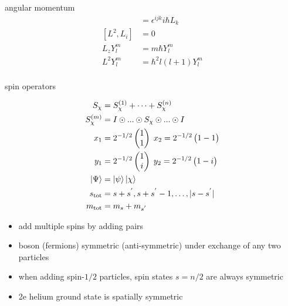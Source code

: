 \documentclass[avery5388, frame, grid]{flashcards}
\begin{document}
\begin{flashcard}{angular momentum}
  {
    \begin{align*}
      [L_{i}, L_{j}] &= \epsilon^{ijk} i \hbar L_{k}\\
      [L^{2}, L_{i}] &= 0\\
      L_{z} Y_{l}^{m} &= m \hbar Y_{l}^{m}\\
      L^{2} Y_{l}^{m} &= \hbar^{2} l(l + 1) Y_{l}^{m}\\
    \end{align*}
  }
\end{flashcard}

\begin{flashcard}{spin operators}
  {
    \begin{align*}
      S_{\chi} &= S_{\chi}^{(1)} + \dots + S_{\chi}^{(n)}\\
      S_{\chi}^{(m)} &= I \odot ... \odot S_{\chi} \odot ... \odot I\\
      x_{1} &= 2^{-1/2} \begin{pmatrix} 1\\ 1 \end{pmatrix} \; x_{2} = 2^{-1/2} \begin{pmatrix} 1 -1 \end{pmatrix}\\
      y_{1} &= 2^{-1/2} \begin{pmatrix} 1\\ i \end{pmatrix} \; y_{2} = 2^{-1/2} \begin{pmatrix} 1 -i \end{pmatrix}\\
      \ket{\Psi} &= \ket{\psi} \ket{\chi}\\
      s_{\textrm{tot}} &= s + s^{'}, s + s^{'} - 1, \dots, \lvert s - s^{'} \rvert\\
      m_{\textrm{tot}} &= m_{s} + m_{s^{'}}
    \end{align*}

    \begin{itemize}
    \item add multiple spins by adding pairs
    \item boson (fermions) symmetric (anti-symmetric) under exchange of any two particles
    \item when adding spin-$1/2$ particles, spin states $s = n / 2$ are always symmetric
    \item 2e helium ground state is spatially symmetric
    \end{itemize}
  }
\end{flashcard}
\end{document}
